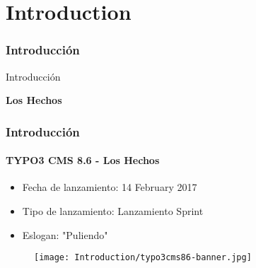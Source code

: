 %

\section{Introduction}
\begin{frame}[fragile]
	\frametitle{Introducción}

	\begin{center}\huge{Introducción}\end{center}
	\begin{center}\huge{\color{typo3darkgrey}\textbf{Los Hechos}}\end{center}

\end{frame}

\begin{frame}[fragile]
	\frametitle{Introducción}
	\framesubtitle{TYPO3 CMS 8.6 - Los Hechos}

	\begin{itemize}
		\item Fecha de lanzamiento: 14 February 2017
		\item Tipo de lanzamiento: Lanzamiento Sprint
		\item Eslogan: "Puliendo"
	\end{itemize}

	\begin{figure}
		\texttt{[image: Introduction/typo3cms86-banner.jpg]}
	\end{figure}

\end{frame}

